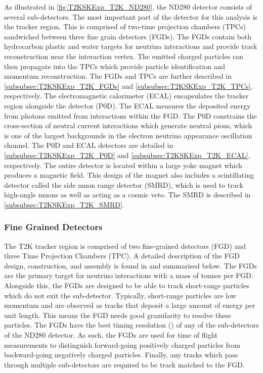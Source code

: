 As illustrated in \autoref{fig:T2KSKExp_T2K_ND280}, the ND280 detector consists of several sub-detectors. The most important part of the detector for this analysis is the tracker region. This is comprised of two-time projection chambers (TPCs) sandwiched between three fine grain detectors (FGDs). The FGDs contain both hydrocarbon plastic and water targets for neutrino interactions and provide track reconstruction near the interaction vertex. The emitted charged particles can then propagate into the TPCs which provide particle identification and momentum reconstruction. The FGDs and TPCs are further described in \autoref{subsubsec:T2KSKExp_T2K_FGDs} and \autoref{subsubsec:T2KSKExp_T2K_TPCs}, respectively. The electromagnetic calorimeter (ECAL) encapsulates the tracker region alongside the  detector (P0D). The ECAL measures the deposited energy from photons emitted from interactions within the FGD. The P0D constrains the cross-section of neutral current interactions which generate neutral pions, which is one of the largest backgrounds in the electron neutrino appearance oscillation channel. The P0D and ECAL detectors are detailed in \autoref{subsubsec:T2KSKExp_T2K_P0D} and \autoref{subsubsec:T2KSKExp_T2K_ECAL}, respectively. The entire detector is located within a large yoke magnet which produces a  magnetic field. This design of the magnet also includes a scintillating detector called the side muon range detector (SMRD), which is used to track high-angle muons as well as acting as a cosmic veto. The SMRD is described in \autoref{subsubsec:T2KSKExp_T2K_SMRD}.  

\subsubsection{Fine Grained Detectors}
\label{subsubsec:T2KSKExp_T2K_FGDs}

The T2K tracker region is comprised of two fine-grained detectors (FGD) and three Time Projection Chambers (TPC). A detailed description of the FGD design, construction, and assembly is found in \cite{Amaudruz2012} and summarised below. The FGDs are the primary target for neutrino interactions with a mass of  tonnes per FGD.
Alongside this, the FGDs are designed to be able to track short-range particles which do not exit the sub-detector. Typically, short-range particles are low momentum and are observed as tracks that deposit a large amount of energy per unit length. This means the FGD needs good granularity to resolve these particles. The FGDs have the best timing resolution () of any of the sub-detectors of the ND280 detector. As such, the FGDs are used for time of flight measurements to distinguish forward-going positively charged particles from backward-going negatively charged particles. Finally, any tracks which pass through multiple sub-detectors are required to be track matched to the FGD.

